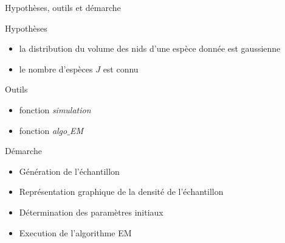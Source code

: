 \documentclass[11pt]{beamer}
\begin{document}
	\begin{frame}{Hypothèses, outils et démarche}
		\begin{block}{\scriptsize Hypothèses}
			\begin{itemize}
				\scriptsize 
				\item la distribution du volume des nids d'une espèce donnée est gaussienne
				\item le nombre d'espèces $J$ est connu
			\end{itemize}
		\end{block}

		\begin{block}{\scriptsize Outils}
			\begin{itemize}
				\scriptsize 
				\item fonction \textit{simulation}
				\item fonction \textit{algo$\_$EM}
			\end{itemize}
		\end{block}

		\begin{block}{\scriptsize  Démarche}
			\begin{itemize}
				\scriptsize 
				\item Génération de l'échantillon
				\item Représentation graphique de la densité de l'échantillon
				\item Détermination des paramètres initiaux
				\item Execution de l'algorithme EM
			\end{itemize}
		\end{block}

	\end{frame}
\end{document}
